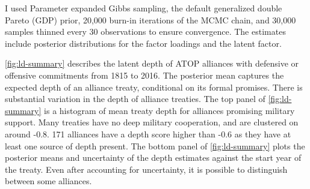 \documentclass[12pt]{article}
\begin{document}
I used Parameter expanded Gibbs sampling, the default generalized double Pareto (GDP) prior, 20,000 burn-in iterations of the MCMC chain, and 30,000 samples thinned every 30 observations to ensure convergence. 
The estimates include posterior distributions for the factor loadings and the latent factor. 
%
%
% 
% 
%
%


\autoref{fig:ld-summary} describes the latent depth of ATOP alliances with defensive or offensive commitments from 1815 to 2016.
The posterior mean captures the expected depth of an alliance treaty, conditional on its formal promises. 
There is substantial variation in the depth of alliance treaties. 
The top panel of \autoref{fig:ld-summary} is a histogram of mean treaty depth for alliances promising military support.  
Many treaties have no deep military cooperation, and are clustered on around -0.8.  
171 alliances have a depth score higher than -0.6 as they have at least one source of depth present. 
The bottom panel of \autoref{fig:ld-summary} plots the posterior means and uncertainty of the depth estimates against the start year of the treaty. 
Even after accounting for uncertainty, it is possible to distinguish between some alliances. 
\end{document}

